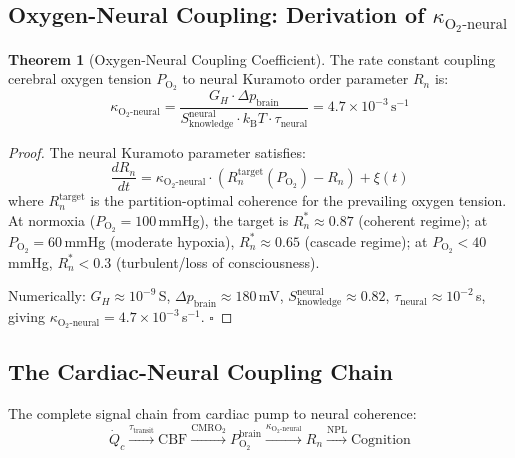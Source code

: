 \documentclass[10pt,twocolumn,a4paper]{article}
\theoremstyle{definition}
\newtheorem{theorem}{Theorem}
\newcommand{\SK}{S_{\text{knowledge}}}
\newcommand{\kBT}{k_{\text{B}}T}
\begin{document}
\subsection{Oxygen-Neural Coupling: Derivation of $\kappa_{\text{O}_2\text{-neural}}$}

\begin{theorem}[Oxygen-Neural Coupling Coefficient]
The rate constant coupling cerebral oxygen tension $P_{\text{O}_2}$ to
neural Kuramoto order parameter $R_n$ is:
\begin{equation}
\boxed{\kappa_{\text{O}_2\text{-neural}} = \frac{G_H \cdot \Delta p_{\text{brain}}}{\SK^{\text{neural}} \cdot \kBT \cdot \tau_{\text{neural}}}
= 4.7 \times 10^{-3}\,\text{s}^{-1}}
\end{equation}
\end{theorem}

\begin{proof}
The neural Kuramoto parameter satisfies:
\begin{equation}
\frac{dR_n}{dt} = \kappa_{\text{O}_2\text{-neural}} \cdot \left(R_n^{\text{target}}(P_{\text{O}_2}) - R_n\right)
+ \xi(t)
\end{equation}
where $R_n^{\text{target}}$ is the partition-optimal coherence for the prevailing oxygen
tension. At normoxia ($P_{\text{O}_2} = 100$\,mmHg), the target is $R_n^* \approx 0.87$
(coherent regime); at $P_{\text{O}_2} = 60$\,mmHg (moderate hypoxia), $R_n^* \approx 0.65$
(cascade regime); at $P_{\text{O}_2} < 40$\,mmHg, $R_n^* < 0.3$ (turbulent/loss of consciousness).

Numerically: $G_H \approx 10^{-9}$\,S, $\Delta p_{\text{brain}} \approx 180$\,mV,
$\SK^{\text{neural}} \approx 0.82$, $\tau_{\text{neural}} \approx 10^{-2}$\,s,
giving $\kappa_{\text{O}_2\text{-neural}} = 4.7 \times 10^{-3}$\,s$^{-1}$. $\square$
\end{proof}

\subsection{The Cardiac-Neural Coupling Chain}

The complete signal chain from cardiac pump to neural coherence:
\begin{equation}
\dot{Q}_c \xrightarrow{\tau_{\text{transit}}} \text{CBF}
\xrightarrow{\text{CMRO}_2} P_{\text{O}_2}^{\text{brain}}
\xrightarrow{\kappa_{\text{O}_2\text{-neural}}} R_n
\xrightarrow{\text{NPL}} \text{Cognition}
\end{equation}
\end{document}
